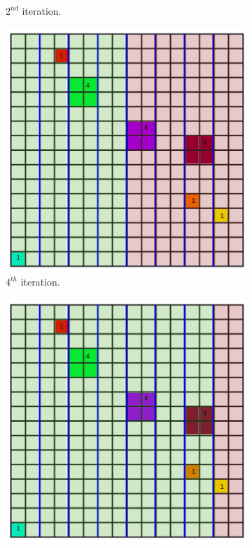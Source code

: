 \documentclass[11pt,a4paper]{article}
\begin{document}
\begin{figure}[H]
\begin{subfigure}[b]{0.475\textwidth}
         \caption{$2^{nd} $ iteration.}
         \label{fig:pi_5000}
     \end{subfigure}
     \hfill
     \begin{subfigure}[b]{0.475\textwidth}
         \centering
         \includegraphics[width=\textwidth]{images/kdtree/grid_5.png}
         \caption{$4^{th} $ iteration.}
         \label{fig:pi_18000}
     \end{subfigure}
     \hfill
     \begin{subfigure}[b]{0.475\textwidth}
         \centering
         \includegraphics[width=\textwidth]{images/kdtree/grid_8.png}

\end{subfigure}
\end{figure}
\end{document}
